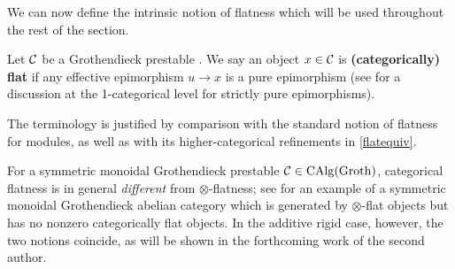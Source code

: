 \documentclass[a4paper,10pt, oneside]{amsart}
\begin{document}
	We can now define the intrinsic notion of flatness which will be used throughout the rest of the section.
	\begin{de}\label{flatdef}
		Let $\mathcal{C}$ be a Grothendieck prestable \infcat. We say an object $x\in \mathcal{C}$ is \textbf{(categorically) flat} if any effective epimorphism $u\to x$ is a pure epimorphism (see \cite{martini2025locally} for a discussion at the 1-categorical level for strictly pure epimorphisms).
	\end{de}
	The terminology is justified by comparison with the standard notion of flatness for modules, as well as with its higher-categorical refinements in \cref{flatequiv}.
	\begin{rem}
	For a symmetric monoidal Grothendieck prestable \infcat $\mathcal{C}\in\mathrm{CAlg}(\mathrm{Groth})$, categorical flatness is in general \emph{different} from $\otimes$-flatness; see \cite{Estrada2012LocallyFP} for an example of a symmetric monoidal Grothendieck abelian category which is generated by $\otimes$-flat objects but has no nonzero categorically flat objects. In the additive rigid case, however, the two notions coincide, as will be shown in the forthcoming work \cite{gentc} of the second author.
	\end{rem}
\end{document}
